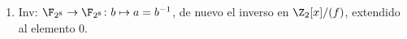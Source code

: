 \begin{enumerate}[label={--}]
\[\begin{bmatrix}
            \end{bmatrix} 
        + 
            \begin{bmatrix} 
            0 \\ 0 \\ 0 \\ 0 \\ 0 \\ 1 \\ 0 \\ 1 
            \end{bmatrix},
        \]
    \vspace{-0.3em}
    \item Inv: $\F_{2^8} \to \F_{2^8} \colon b \mapsto a = b^{-1}$, de nuevo el inverso en $\Z_2[x]/(f)$, extendido al elemento 0.
\end{enumerate}
\vspace{-1.1em}